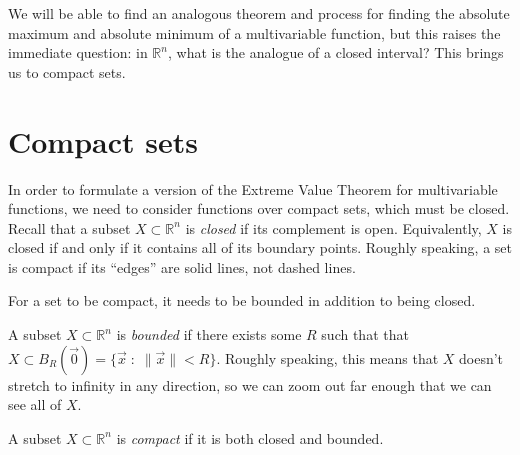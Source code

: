 \documentclass{ximera}
\begin{document}
We will be able to find an analogous theorem and process for finding the absolute maximum and absolute minimum of a multivariable function, but this raises the immediate question: in $\mathbb{R}^n$, what is the analogue of a closed interval? This brings us to compact sets.

\section*{Compact sets}

In order to formulate a version of the Extreme Value Theorem for multivariable functions, we need to consider functions over compact sets, which must be closed. Recall that a subset $X\subset\mathbb{R}^n$ is \emph{closed} if its complement is open. Equivalently, $X$ is closed if and only if it contains all of its boundary points. Roughly speaking, a set is compact if its ``edges'' are solid lines, not dashed lines.

For a set to be compact, it needs to be bounded in addition to being closed.

\begin{definition}
A subset $X\subset\mathbb{R}^n$ is \emph{bounded} if there exists some $R$ such that that $X\subset B_R(\vec{0}) = \{\vec{x}\;:\;\|\vec{x}\|<R\}$. Roughly speaking, this means that $X$ doesn't stretch to infinity in any direction, so we can zoom out far enough that we can see all of $X$.

A subset $X\subset\mathbb{R}^n$ is \emph{compact} if it is both closed and bounded.
\end{definition}
\end{document}
